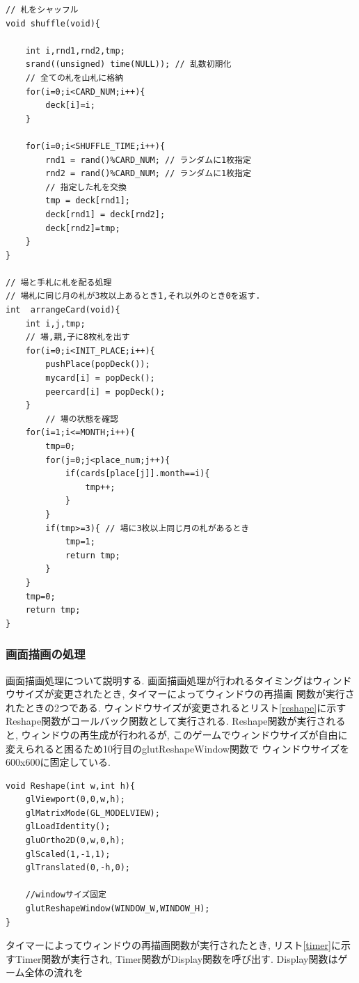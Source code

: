 \documentclass[a4j]{jarticle}
\begin{document}
\begin{lstlisting}[basicstyle=\ttfamily\footnotesize, frame=single,label=initgame,caption=ゲームの初期化処理]
// 札をシャッフル
void shuffle(void){

    int i,rnd1,rnd2,tmp;
    srand((unsigned) time(NULL)); // 乱数初期化
    // 全ての札を山札に格納
    for(i=0;i<CARD_NUM;i++){
        deck[i]=i;
    }

    for(i=0;i<SHUFFLE_TIME;i++){
        rnd1 = rand()%CARD_NUM; // ランダムに1枚指定
        rnd2 = rand()%CARD_NUM; // ランダムに1枚指定
        // 指定した札を交換
        tmp = deck[rnd1];
        deck[rnd1] = deck[rnd2];
        deck[rnd2]=tmp;
    }
}

// 場と手札に札を配る処理
// 場札に同じ月の札が3枚以上あるとき1,それ以外のとき0を返す.
int  arrangeCard(void){
    int i,j,tmp;
    // 場,親,子に8枚札を出す
    for(i=0;i<INIT_PLACE;i++){
        pushPlace(popDeck());
        mycard[i] = popDeck();
        peercard[i] = popDeck();
    }
        // 場の状態を確認
    for(i=1;i<=MONTH;i++){
        tmp=0;
        for(j=0;j<place_num;j++){
            if(cards[place[j]].month==i){
                tmp++;
            }
        }
        if(tmp>=3){ // 場に3枚以上同じ月の札があるとき
            tmp=1;
            return tmp;
        }
    }
    tmp=0;
    return tmp;
}
    \end{lstlisting}

    \subsubsection{画面描画の処理}
    画面描画処理について説明する. 画面描画処理が行われるタイミングはウィンドウサイズが変更されたとき, タイマーによってウィンドウの再描画
    関数が実行されたときの2つである. ウィンドウサイズが変更されるとリスト\ref{reshape}に示すReshape関数がコールバック関数として実行される. 
    Reshape関数が実行されると, ウィンドウの再生成が行われるが, このゲームでウィンドウサイズが自由に変えられると困るため10行目のglutReshapeWindow関数で
    ウィンドウサイズを600x600に固定している.
\begin{lstlisting}[basicstyle=\ttfamily\footnotesize, frame=single,label=reshape,caption=Reshape関数]
void Reshape(int w,int h){
    glViewport(0,0,w,h);
    glMatrixMode(GL_MODELVIEW);
    glLoadIdentity();
    gluOrtho2D(0,w,0,h);
    glScaled(1,-1,1);
    glTranslated(0,-h,0);

    //windowサイズ固定 
    glutReshapeWindow(WINDOW_W,WINDOW_H);
}
\end{lstlisting}
  タイマーによってウィンドウの再描画関数が実行されたとき, リスト\ref{timer}に示すTimer関数が実行され, Timer関数がDisplay関数を呼び出す.
  Display関数はゲーム全体の流れを  
\end{document}
